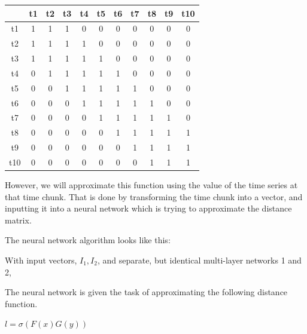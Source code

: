 \documentclass{article}
\begin{document}
\begin{tabular}{|c|c|c|c|c|c|c|c|c|c|c|}
	\hline 
	& t1 & t2 & t3 & t4 & t5 & t6 & t7 & t8 & t9 & t10\\ \hline 
	t1 & 1 & 1 & 1 & 0 & 0 & 0 & 0 & 0 & 0 & 0\\ \hline 
	t2 & 1 & 1 & 1 & 1 & 0 & 0 & 0 & 0 & 0 & 0\\ \hline 
	t3 & 1 & 1 & 1 & 1 & 1 & 0 & 0 & 0 & 0 & 0\\ \hline 
	t4 & 0 & 1 & 1 & 1 & 1 & 1 & 0 & 0 & 0 & 0\\ \hline 
	t5 & 0 & 0 & 1 & 1 & 1 & 1 & 1 & 0 & 0 & 0\\ \hline 
	t6 & 0 & 0 & 0 & 1 & 1 & 1 & 1 & 1 & 0 & 0\\ \hline 
	t7 & 0 & 0 & 0 & 0 & 1 & 1 & 1 & 1 & 1 & 0\\ \hline 
	t8 & 0 & 0 & 0 & 0 & 0 & 1 & 1 & 1 & 1 & 1\\ \hline 
	t9 & 0 & 0 & 0 & 0 & 0 & 0 & 1 & 1 & 1 & 1\\ \hline 
	t10 & 0 & 0 & 0 & 0 & 0 & 0 & 0 & 1 & 1 & 1\\ \hline 
\end{tabular}

However, we will approximate this function using the value of the time series at that time chunk. That is done by transforming the time chunk into a vector, and inputting it into a neural network which is trying to approximate the distance matrix. 

The neural network algorithm looks like this:

With input vectors, $I_1, I_2$, and separate, but identical multi-layer networks 1 and 2, 	



The neural network is given the task of approximating the following distance function. 


$l = \sigma(F(x) G(y))$


{}

\end{document}
